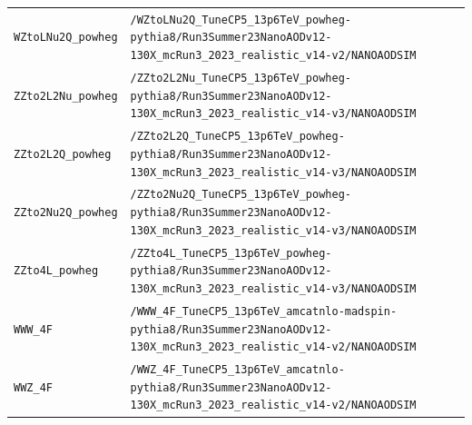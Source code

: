 \begin{longtable}{@{}>{\RaggedRight\arraybackslash}p{} >{\RaggedRight\arraybackslash}p{}@{}}
\addlinespace[2pt]
\texttt{WZtoLNu2Q\_\allowbreak{}powheg} & \texttt{/\allowbreak{}WZtoLNu2Q\_\allowbreak{}TuneCP5\_\allowbreak{}13p6TeV\_\allowbreak{}powheg-\allowbreak{}pythia8/\allowbreak{}Run3Summer23NanoAODv12-\allowbreak{}130X\_\allowbreak{}mcRun3\_\allowbreak{}2023\_\allowbreak{}realistic\_\allowbreak{}v14-\allowbreak{}v2/\allowbreak{}NANOAODSIM} \\
\addlinespace[2pt]
\texttt{ZZto2L2Nu\_\allowbreak{}powheg} & \texttt{/\allowbreak{}ZZto2L2Nu\_\allowbreak{}TuneCP5\_\allowbreak{}13p6TeV\_\allowbreak{}powheg-\allowbreak{}pythia8/\allowbreak{}Run3Summer23NanoAODv12-\allowbreak{}130X\_\allowbreak{}mcRun3\_\allowbreak{}2023\_\allowbreak{}realistic\_\allowbreak{}v14-\allowbreak{}v3/\allowbreak{}NANOAODSIM} \\
\addlinespace[2pt]
\texttt{ZZto2L2Q\_\allowbreak{}powheg} & \texttt{/\allowbreak{}ZZto2L2Q\_\allowbreak{}TuneCP5\_\allowbreak{}13p6TeV\_\allowbreak{}powheg-\allowbreak{}pythia8/\allowbreak{}Run3Summer23NanoAODv12-\allowbreak{}130X\_\allowbreak{}mcRun3\_\allowbreak{}2023\_\allowbreak{}realistic\_\allowbreak{}v14-\allowbreak{}v3/\allowbreak{}NANOAODSIM} \\
\addlinespace[2pt]
\texttt{ZZto2Nu2Q\_\allowbreak{}powheg} & \texttt{/\allowbreak{}ZZto2Nu2Q\_\allowbreak{}TuneCP5\_\allowbreak{}13p6TeV\_\allowbreak{}powheg-\allowbreak{}pythia8/\allowbreak{}Run3Summer23NanoAODv12-\allowbreak{}130X\_\allowbreak{}mcRun3\_\allowbreak{}2023\_\allowbreak{}realistic\_\allowbreak{}v14-\allowbreak{}v3/\allowbreak{}NANOAODSIM} \\
\addlinespace[2pt]
\texttt{ZZto4L\_\allowbreak{}powheg} & \texttt{/\allowbreak{}ZZto4L\_\allowbreak{}TuneCP5\_\allowbreak{}13p6TeV\_\allowbreak{}powheg-\allowbreak{}pythia8/\allowbreak{}Run3Summer23NanoAODv12-\allowbreak{}130X\_\allowbreak{}mcRun3\_\allowbreak{}2023\_\allowbreak{}realistic\_\allowbreak{}v14-\allowbreak{}v3/\allowbreak{}NANOAODSIM} \\
\addlinespace[2pt]
\texttt{WWW\_\allowbreak{}4F} & \texttt{/\allowbreak{}WWW\_\allowbreak{}4F\_\allowbreak{}TuneCP5\_\allowbreak{}13p6TeV\_\allowbreak{}amcatnlo-\allowbreak{}madspin-\allowbreak{}pythia8/\allowbreak{}Run3Summer23NanoAODv12-\allowbreak{}130X\_\allowbreak{}mcRun3\_\allowbreak{}2023\_\allowbreak{}realistic\_\allowbreak{}v14-\allowbreak{}v2/\allowbreak{}NANOAODSIM} \\
\addlinespace[2pt]
\texttt{WWZ\_\allowbreak{}4F} & \texttt{/\allowbreak{}WWZ\_\allowbreak{}4F\_\allowbreak{}TuneCP5\_\allowbreak{}13p6TeV\_\allowbreak{}amcatnlo-\allowbreak{}pythia8/\allowbreak{}Run3Summer23NanoAODv12-\allowbreak{}130X\_\allowbreak{}mcRun3\_\allowbreak{}2023\_\allowbreak{}realistic\_\allowbreak{}v14-\allowbreak{}v2/\allowbreak{}NANOAODSIM} \\

\end{longtable}
